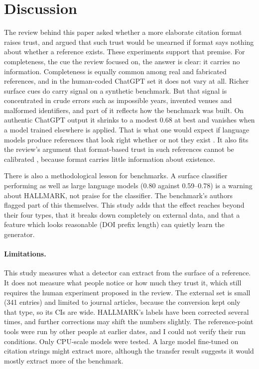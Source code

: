 \documentclass[acmsmall,nonacm]{acmart}
\begin{document}
\section{Discussion}

The review behind this paper asked whether a more elaborate citation format raises trust, and argued that such trust would be unearned if format says nothing about whether a reference exists. These experiments support that premise. For completeness, the cue the review focused on, the answer is clear: it carries no information. Completeness is equally common among real and fabricated references, and in the human-coded ChatGPT set it does not vary at all. Richer surface cues do carry signal on a synthetic benchmark. But that signal is concentrated in crude errors such as impossible years, invented venues and malformed identifiers, and part of it reflects how the benchmark was built. On authentic ChatGPT output it shrinks to a modest 0.68 at best and vanishes when a model trained elsewhere is applied. That is what one would expect if language models produce references that look right whether or not they exist \cite{walters2023}. It also fits the review's argument that format-based trust in such references cannot be calibrated \cite{leesee2004}, because format carries little information about existence.

There is also a methodological lesson for benchmarks. A surface classifier performing as well as large language models (0.80 against 0.59--0.78) is a warning about HALLMARK, not praise for the classifier. The benchmark's authors flagged part of this themselves. This study adds that the effect reaches beyond their four types, that it breaks down completely on external data, and that a feature which looks reasonable (DOI prefix length) can quietly learn the generator.

\paragraph{Limitations.} This study measures what a detector can extract from the surface of a reference. It does not measure what people notice or how much they trust it, which still requires the human experiment proposed in the review. The external set is small (341 entries) and limited to journal articles, because the conversion kept only that type, so its CIs are wide. HALLMARK's labels have been corrected several times, and further corrections may shift the numbers slightly. The reference-point tools were run by other people at earlier dates, and I could not verify their run conditions. Only CPU-scale models were tested. A large model fine-tuned on citation strings might extract more, although the transfer result suggests it would mostly extract more of the benchmark.
\end{document}
